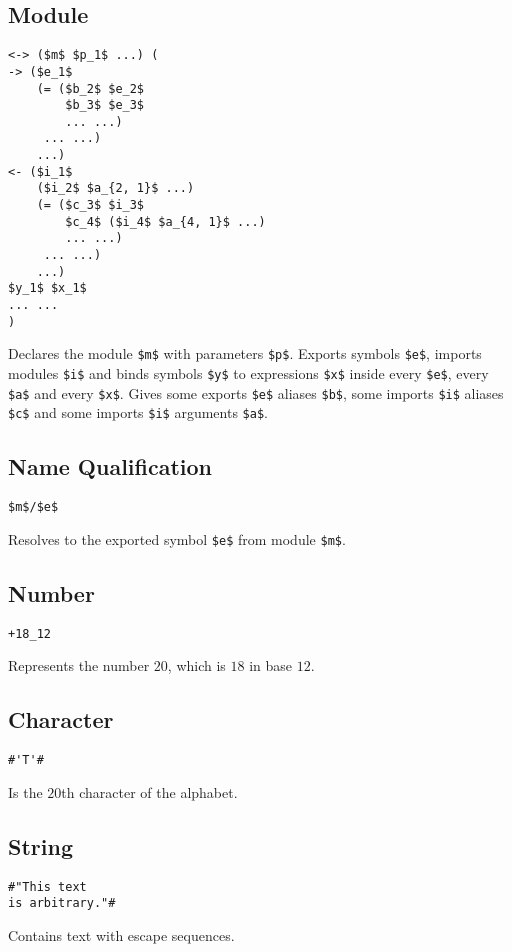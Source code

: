 \documentclass{article}
\begin{document}
\begin{multicols}
\bigskip\subsection*{Module}
\begin{lstlisting}
<-> ($m$ $p_1$ ...) (
-> ($e_1$
    (= ($b_2$ $e_2$
        $b_3$ $e_3$
        ... ...)
     ... ...)
    ...)
<- ($i_1$
    ($i_2$ $a_{2, 1}$ ...)
    (= ($c_3$ $i_3$
        $c_4$ ($i_4$ $a_{4, 1}$ ...)
        ... ...)
     ... ...)
    ...)
$y_1$ $x_1$
... ...
)
\end{lstlisting}
Declares the module \lstinline{$m$} with parameters \lstinline{$p$}.
Exports symbols \lstinline{$e$},
imports modules \lstinline{$i$} and
binds symbols \lstinline{$y$} to expressions \lstinline{$x$}
inside every \lstinline{$e$}, every \lstinline{$a$} and every \lstinline{$x$}.
Gives some exports \lstinline{$e$} aliases \lstinline{$b$},
some imports \lstinline{$i$} aliases \lstinline{$c$} and
some imports \lstinline{$i$} arguments \lstinline{$a$}.

\bigskip\subsection*{Name Qualification}
\begin{lstlisting}
$m$/$e$
\end{lstlisting}
Resolves to the exported symbol \lstinline{$e$} from module \lstinline{$m$}.

\bigskip\subsection*{Number}
\begin{lstlisting}
+18_12
\end{lstlisting}
Represents the number $20$, which
is $18$ in base $12$.

\bigskip\subsection*{Character}
\begin{lstlisting}
#'T'#
\end{lstlisting}
Is the $20$th character of the alphabet.

\bigskip\subsection*{String}
\begin{lstlisting}
#"This text
is arbitrary."#
\end{lstlisting}
Contains text with escape sequences.


\end{multicols}
\end{document}

